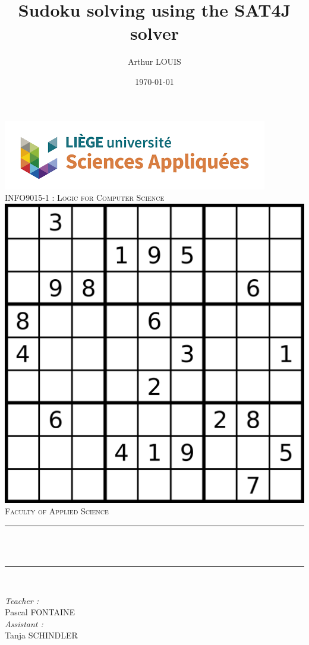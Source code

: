 \title{Sudoku solving using the SAT4J solver}								%
\author{Arthur LOUIS}								%
\date{\today}											%

\makeatletter
\let\thetitle\@title
\let\theauthor\@author
\let\thedate\@date
\makeatother

\pagestyle{fancy}
\fancyhf{}
\rhead{\theauthor}
\lhead{\thetitle}
\cfoot{\thepage}

\begin{titlepage}
 \centering
 \vspace*{0.5 cm}
 \includegraphics[scale = 0.7]{figs/facsa.png}\\[1.0 cm]	%
 \textsc{\Large INFO9015-1 : Logic for Computer Science}\\[1.5 cm]	%
 \includegraphics*[width=.3\textwidth]{figs/sudoku.png}\\[1.5 cm]
 \textsc{\LARGE \newline\newline Faculty of Applied Science}\\[0.5 cm]				%
 \rule{\linewidth}{0.2 mm} \\[0.4 cm]
 {\huge \bfseries \thetitle}\\
 \rule{\linewidth}{0.2 mm} \\[1.5 cm]

 \begin{minipage}{0.5\textwidth}
 	\begin{flushleft} \large
 		\emph{Teacher :}\\
 		Pascal FONTAINE\\
    \vspace{0.5cm}
    \emph{Assistant :}\\
    Tanja SCHINDLER\\
 		\end{flushleft}
 		\end{minipage}~
 		\begin{minipage}{0.4\textwidth}


\end{minipage}
\end{titlepage}
